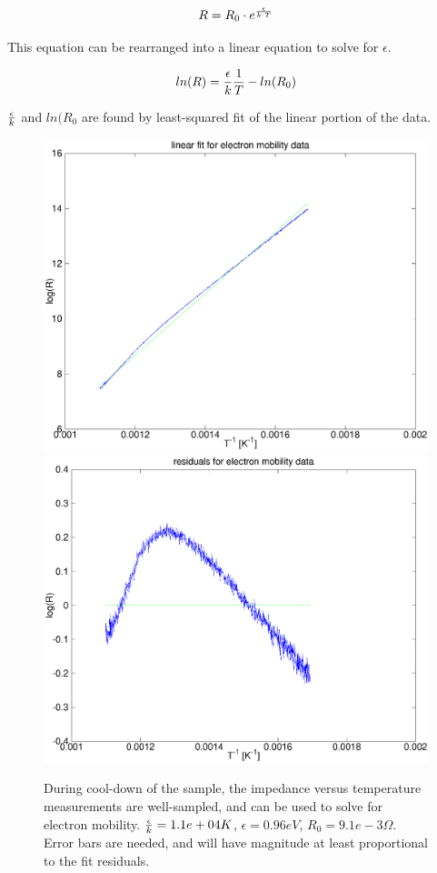 \documentclass[12pt,oneside,english]{article}
\begin{document}
	\begin{equation}
		R = R_0 \cdot e^{\epsilon\over{k \cdot T}}
		\label{eq:emobility}
	\end{equation}
	
	This equation can be rearranged into a linear equation to solve for $\epsilon$.
	
	\begin{equation}
		ln(R) = {\epsilon\over{k}} {1\over{T}} - ln(R_0)
		\label{eq:solve_emobility}
	\end{equation}
	
	${\epsilon\over{k}}$ and $ln(R_0$ are found by least-squared fit of the linear portion of the data.
	
	\begin{figure}
	
	\includegraphics[scale=0.4]{images/electron_mobility.eps} 
	\includegraphics[scale=0.4]{images/electron_mobility_residual.eps}
	\label{f:emobility}
	\caption{During cool-down of the sample, the impedance versus temperature measurements are well-sampled, and can be used to solve for electron mobility.  ${\epsilon\over{k}} = 1.1e+04 K$, $\epsilon = 0.96 eV$, $R_0 = 9.1e-3\Omega$.  Error bars are needed, and will have magnitude at least proportional to the fit residuals.}
	\end{figure}
\end{document}
